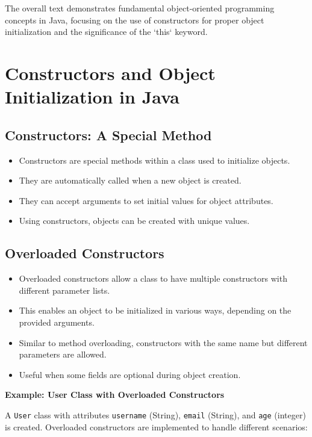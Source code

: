 \documentclass{article}
\begin{document}
The overall text demonstrates fundamental object-oriented programming concepts in Java, focusing on the use of constructors for proper object initialization and the significance of the `this` keyword.


\section{Constructors and Object Initialization in Java}

\subsection{Constructors: A Special Method}

\begin{itemize}
    \item Constructors are special methods within a class used to initialize objects.
    \item They are automatically called when a new object is created.
    \item They can accept arguments to set initial values for object attributes.
    \item Using constructors, objects can be created with unique values.
\end{itemize}

\subsection{Overloaded Constructors}

\begin{itemize}
    \item Overloaded constructors allow a class to have multiple constructors with different parameter lists.
    \item This enables an object to be initialized in various ways, depending on the provided arguments.
    \item Similar to method overloading, constructors with the same name but different parameters are allowed.  
    \item  Useful when some fields are optional during object creation.
\end{itemize}

\textbf{Example: User Class with Overloaded Constructors}

A \texttt{User} class with attributes \texttt{username} (String), \texttt{email} (String), and \texttt{age} (integer) is created.  Overloaded constructors are implemented to handle different scenarios:
\end{document}
